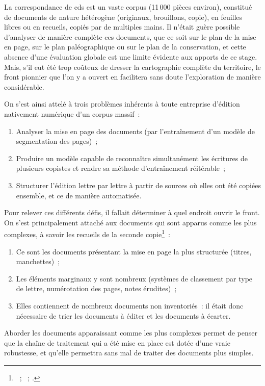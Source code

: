 \documentclass[a4paper,12pt,twoside]{book}
\begin{document}
		La correspondance de \gls{cds} est un vaste corpus (11\,000 pièces environ), constitué de documents de nature hétérogène (originaux, brouillons, copie), en feuilles libres ou en recueils, copiés par de multiples mains. Il n'était guère possible d'analyser de manière complète ces documents, que ce soit sur le plan de la mise en page, sur le plan paléographique ou sur le plan de la conservation, et cette absence d'une évaluation globale est une limite évidente aux apports de ce stage. Mais, s'il eut été trop coûteux de dresser la cartographie complète du territoire, le front pionnier que l'on y a ouvert en facilitera sans doute l'exploration de manière considérable.
		
		On s'est ainsi attelé à trois problèmes inhérents à toute entreprise d'édition nativement numérique d'un corpus massif~: 
		
		\begin{enumerate}
			\item Analyser la mise en page des documents (par l'entraînement d'un modèle de segmentation des pages)~;
			\item Produire un modèle capable de reconnaître simultanément les écritures de plusieurs copistes et rendre sa méthode d'entraînement réitérable~;
			\item Structurer l'édition lettre par lettre à partir de sources où elles ont été copiées ensemble, et ce de manière automatisée.
		\end{enumerate}
		
		Pour relever ces différents défis, il fallait déterminer à quel endroit ouvrir le front. On s'est principalement attaché aux documents qui sont apparus comme les plus complexes, à savoir les recueils de la seconde copie\footnote{\cite{CdS02001330}~; \cite{CdS02001369}~; \cite{CdS02001334}.}~:
		
		\begin{enumerate}
			\item Ce sont les documents présentant la mise en page la plus structurée (titres, manchettes)~;
			\item Les éléments marginaux y sont nombreux (systèmes de classement par type de lettre, numérotation des pages, notes érudites)~;
			\item Elles contiennent de nombreux documents non inventoriés~: il était donc nécessaire de trier les documents à éditer et les documents à écarter.
		\end{enumerate}
		
		Aborder les documents apparaissant comme les plus complexes permet de penser que la chaîne de traitement qui a été mise en place est dotée d'une vraie robustesse, et qu'elle permettra sans mal de traiter des documents plus simples. 
		
\end{document}
